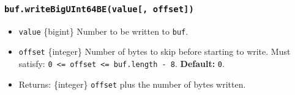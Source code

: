 \begin{Shaded}
\begin{Highlighting}[]
\NormalTok{ \{ }\NormalTok{ \} } \OperatorTok{;}

\OperatorTok{=} \NormalTok{(}\NormalTok{)}\OperatorTok{;}

\NormalTok{(}\OperatorTok{,} \NormalTok{)}\OperatorTok{;}

\OperatorTok{;}
\end{Highlighting}
\end{Shaded}

\begin{Shaded}
\begin{Highlighting}[]
\NormalTok{ \{ }\NormalTok{ \} }\OperatorTok{=} \NormalTok{(}\NormalTok{)}\OperatorTok{;}

\OperatorTok{=} \NormalTok{(}\NormalTok{)}\OperatorTok{;}

\NormalTok{(}\OperatorTok{,} \NormalTok{)}\OperatorTok{;}

\OperatorTok{;}
\end{Highlighting}
\end{Shaded}

\subsubsection{\texorpdfstring{\texttt{buf.writeBigUInt64BE(value{[},\ offset{]})}}{buf.writeBigUInt64BE(value{[}, offset{]})}}\label{buf.writebiguint64bevalue-offset}

\begin{itemize}
\tightlist
\item
  \texttt{value} \{bigint\} Number to be written to \texttt{buf}.
\item
  \texttt{offset} \{integer\} Number of bytes to skip before starting to
  write. Must satisfy:
  \texttt{0\ \textless{}=\ offset\ \textless{}=\ buf.length\ -\ 8}.
  \textbf{Default:} \texttt{0}.
\item
  Returns: \{integer\} \texttt{offset} plus the number of bytes written.
\end{itemize}

